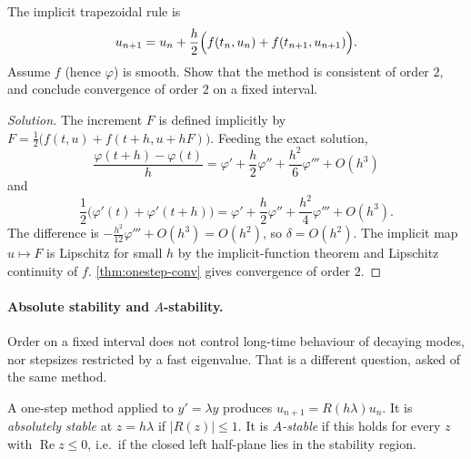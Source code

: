 \documentclass[11pt,a4paper]{article}
\begin{document}
\begin{exercise}
\label{exer:trap-order}
The implicit trapezoidal rule is
\[
u_{n+1}
=
u_{n}+\frac h2\Bigl(f(t_{n},u_{n})+f(t_{n+1},u_{n+1})\Bigr).
\]
Assume \(f\) (hence \(\varphi\)) is smooth. Show that the method is consistent of order \(2\), and conclude convergence of order \(2\) on a fixed interval.
\end{exercise}

\begin{proof}[Solution]
The increment \(F\) is defined implicitly by \(F=\frac12\bigl(f(t,u)+f(t+h,u+hF)\bigr)\). Feeding the exact solution,
\[
\frac{\varphi(t+h)-\varphi(t)}{h}
=
\varphi'+\frac h2\varphi''+\frac{h^{2}}{6}\varphi'''+O(h^{3})
\]
and
\[
\frac12\bigl(\varphi'(t)+\varphi'(t+h)\bigr)
=
\varphi'+\frac h2\varphi''+\frac{h^{2}}{4}\varphi'''+O(h^{3}).
\]
The difference is \(-\frac{h^{2}}{12}\varphi'''+O(h^{3})=O(h^{2})\), so \(\delta=O(h^{2})\). The implicit map \(u\mapsto F\) is Lipschitz for small \(h\) by the implicit-function theorem and Lipschitz continuity of \(f\). \cref{thm:onestep-conv} gives convergence of order \(2\).
\end{proof}

\paragraph{Absolute stability and \(A\)-stability.}

Order on a fixed interval does not control long-time behaviour of decaying modes, nor stepsizes restricted by a fast eigenvalue. That is a different question, asked of the same method.

\begin{definition}
\label{def:abs-stab}
A one-step method applied to \(y'=\lambda y\) produces \(u_{n+1}=R(h\lambda)u_{n}\). It is \emph{absolutely stable} at \(z=h\lambda\) if \(\lvert R(z)\rvert\le 1\). It is \emph{\(A\)-stable} if this holds for every \(z\) with \(\operatorname{Re}z\le 0\), i.e.\ if the closed left half-plane lies in the stability region.
\end{definition}
\end{document}
